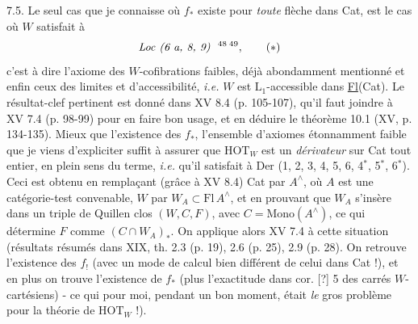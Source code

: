 7.5. Le seul cas que je connaisse où $f_*$ existe pour \textit{toute} flèche dans Cat, est le cas où $W$ satisfait à
\[
\textit{Loc (6 a, 8, 9)}\ \ \text{\footnotemark[48]\,\footnotemark[49]}, \tag*{$(*)$} %
\]
c'est à dire l'axiome des $W$-cofibrations faibles, déjà abondamment mentionné et enfin ceux des limites et d'accessibilité, \textit{i.e.} $W$ est $\mathrm{L}_1$-accessible dans \underline{Fl}(Cat). Le résultat-clef pertinent est donné dans XV 8.4 (p. 105-107), qu'il faut joindre à XV 7.4 (p. 98-99) pour en faire
bon usage, et en déduire le théorème 10.1 (XV, p. 134-135). Mieux que l'existence des $f_*$, l'ensemble d'axiomes étonnamment faible que je viens d'expliciter suffit à assurer que $\mathrm{HOT}_W$ est un \textit{dérivateur} sur Cat tout entier, en plein sens du terme, \textit{i.e.} qu'il satisfait à Der (1, 2, 3, 4, 5, 6, 4$^*$, 5$^*$, 6$^*$). Ceci est obtenu en remplaçant (grâce à XV 8.4) Cat par
$A^\wedge$, où $A$ est une catégorie-test convenable, $W$ par $W_A \subset \mathrm{Fl}\, A^\wedge$, et en prouvant que $W_A$ s'insère dans un triple de Quillen clos $(W,C,F)$, avec $C = \mathrm{Mono}(A^\wedge)$, ce qui détermine $F$ comme $(C \cap W_A)_*$. On applique alors XV 7.4 à cette situation (résultats résumés dans XIX, th. 2.3 (p. 19), 2.6 (p. 25), 2.9 (p. 28). On retrouve l'existence des $f_!$ (avec un mode de calcul bien différent de celui dans Cat !), et en plus on trouve l'existence de $f_*$ (plus l'exactitude dans cor. [?] 5
des carrés $W$-cartésiens) - ce qui pour moi, pendant un bon moment, était \textit{le} gros problème pour la théorie de $\mathrm{HOT}_W$ !).

